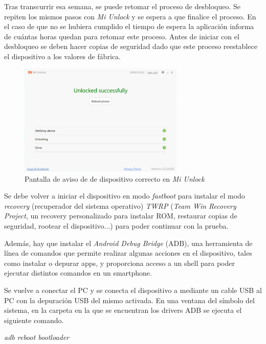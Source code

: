 \documentclass[12pt,a4paper,onecolumn,oneside]{report}
\begin{document}
Tras transcurrir esa semana, se puede retomar el proceso de desbloqueo. Se repiten los mismos pasos con \textit{Mi Unlock} y se espera a que finalice el proceso. En el caso de que no se hubiera cumplido el tiempo de espera la aplicación informa de cuántas horas quedan para retomar este proceso. Antes de iniciar con el desbloqueo se deben hacer copias de seguridad dado que este proceso reestablece el dispositivo a los valores de fábrica.

\begin{figure}[H] 
\centering
  \includegraphics[width=0.7\textwidth]{figuras/root5.png}
  \caption[Pantalla de aviso de de dispositivo correcto en \textit{Mi Unlock}]{Pantalla de aviso de de dispositivo correcto en \textit{Mi Unlock}\\
  }
  \label{fig:root5}
\end{figure}

Se debe volver a iniciar el dispositivo en modo \textit{fastboot} para instalar el modo \textit{recovery} (recuperador del sistema operativo) \textit{TWRP} (\textit{Team Win Recovery Project}, un recovery personalizado para instalar ROM, restaurar copias de seguridad, rootear el dispositivo...) para poder continuar con la prueba.

Además, hay que instalar el \textit{Android Debug Bridge} (ADB), una herramienta de línea de comandos que permite realizar algunas acciones en el dispositivo, tales como instalar o depurar apps, y proporciona acceso a un shell para poder ejecutar distintos comandos en un smartphone.

Se vuelve a conectar el PC y se conecta el dispositivo a mediante un cable USB al PC con la depuración USB del mismo activada. En una ventana del símbolo del sistema, en la carpeta en la que se encuentran los drivers ADB se ejecuta el siguiente comando.

\textit{adb reboot bootloader}
\end{document}
